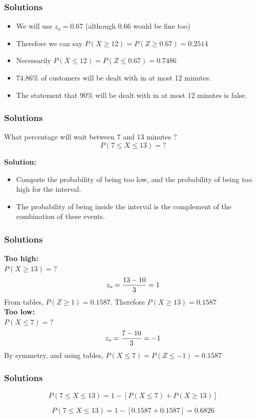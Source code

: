 \begin{frame}
\frametitle{Solutions}
\begin{itemize}
\item We will use $z_o =0.67$ (although 0.66 would be fine too) 
\item Therefore we can say $P(X \geq 12 ) = P(Z \geq 0.67)  = 0.2514$
\item Necessarily  $P(X \leq 12 ) = P(Z \leq 0.67) = 0.7486$
\item $74.86\%$ of customers will be dealt with in at most 12 minutes.
\item The statement that $90\%$ will be dealt with in at most 12 minutes is false.
\end{itemize}
\end{frame}
\begin{frame}
\frametitle{Solutions}
What percentage will wait between 7 and 13 minutes ?\\

\[P(7 \leq X \leq 13)   = ?\]

\textbf{Solution:}
\begin{itemize}
	\item Compute the probability of being too low, and the probability of being too high for the interval.\item The probability of being inside the interval is the complement of the combination of these events.
\end{itemize}

\end{frame}
\begin{frame}
\frametitle{Solutions}
\textbf{Too high:}\\
$P(X \geq 13) = ?$
\[ z_o  = {13 - 10  \over 3} = 1\]
\smallskip
From tables, $P(Z \geq 1) = 0.1587$. Therefore $P(X \geq 13) = 0.1587$\\ \bigskip
\textbf{Too low:}\\
$P(X \leq 7) = ?$
\[ z_o  = {7 - 10  \over 3} = -1\]
By symmetry, and using tables, $P(X \leq 7) = P(Z \leq -1)= 0.1587$\\ \bigskip
\end{frame}
\begin{frame}
\frametitle{Solutions}

\[P(7 \leq X \leq 13)  = 1 - [ P(X \leq 7)  + P(X \geq 13) ] \]

\[P(7 \leq X \leq 13)  =  1 - [0.1587+0.1587] = 0.6826\]

\end{frame}

